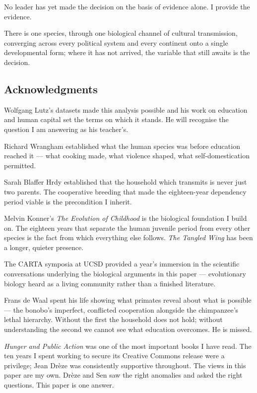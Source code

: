 \documentclass[12pt,letterpaper]{article}
\begin{document}
No leader has yet made the decision on the basis of evidence alone.
I provide the evidence.

There is one species, through one biological channel of cultural
transmission, converging across every political system and every
continent onto a single developmental form; where it has not arrived,
the variable that still awaits is the decision.

\subsection*{Acknowledgments}

Wolfgang Lutz's datasets made this analysis possible and his work on
education and human capital set the terms on which it stands. He will
recognise the question I am answering as his teacher's.

Richard Wrangham established what the human species was before
education reached it --- what cooking made, what violence shaped, what
self-domestication permitted.

Sarah Blaffer Hrdy established that the household which transmits is
never just two parents. The cooperative breeding that made the
eighteen-year dependency period viable is the precondition I
inherit.

Melvin Konner's \emph{The Evolution of Childhood} is the biological
foundation I build on. The eighteen years that separate the
human juvenile period from every other species is the fact from which
everything else follows. \emph{The Tangled Wing} has been a longer,
quieter presence.

The CARTA symposia at UCSD provided a year's immersion in the
scientific conversations underlying the biological arguments in this
paper --- evolutionary biology heard as a living community rather than
a finished literature.

Frans de Waal spent his life showing what primates reveal about what
is possible --- the bonobo's imperfect, conflicted cooperation
alongside the chimpanzee's lethal hierarchy. Without the first the
household does not hold; without understanding the second we cannot
see what education overcomes. He is missed.

\emph{Hunger and Public Action} was one of the most important books I
have read. The ten years I spent working to secure its Creative
Commons release were a privilege; Jean Drèze was consistently
supportive throughout. The views in this paper are my own. Drèze and
Sen saw the right anomalies and asked the right questions. This paper
is one answer.
\end{document}
